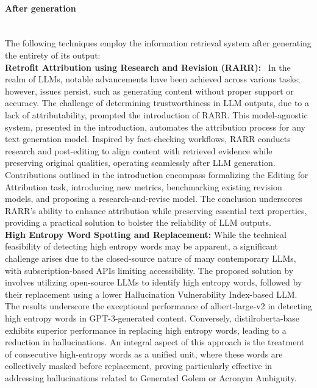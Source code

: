 \documentclass[11pt]{article}
\begin{document}
\paragraph{After generation} \mbox{} \\
\label{subsubsubsec:After generation}
The following techniques employ the information retrieval system after generating the entirety of its output: \\
\textbf{Retrofit Attribution using Research and Revision (RARR):}~\cite{gao2023rarr} In the realm of LLMs, notable advancements have been achieved across various tasks; however, issues persist, such as generating content without proper support or accuracy. The challenge of determining trustworthiness in LLM outputs, due to a lack of attributability, prompted the introduction of RARR. This model-agnostic system, presented in the introduction, automates the attribution process for any text generation model. Inspired by fact-checking workflows, RARR conducts research and post-editing to align content with retrieved evidence while preserving original qualities, operating seamlessly after LLM generation. Contributions outlined in the introduction encompass formalizing the Editing for Attribution task, introducing new metrics, benchmarking existing revision models, and proposing a research-and-revise model. The conclusion underscores RARR's ability to enhance attribution while preserving essential text properties, providing a practical solution to bolster the reliability of LLM outputs. \\
\textbf{High Entropy Word Spotting and Replacement:} While the technical feasibility of detecting high entropy words may be apparent, a significant challenge arises due to the closed-source nature of many contemporary LLMs, with subscription-based APIs limiting accessibility. The proposed solution by \cite{rawte2023troubling} involves utilizing open-source LLMs to identify high entropy words, followed by their replacement using a lower Hallucination Vulnerability Index-based LLM. The results underscore the exceptional performance of albert-large-v2 \cite{Lan2020ALBERT:} in detecting high entropy words in GPT-3-generated content. Conversely, distilroberta-base \cite{sanh2019distilbert} exhibits superior performance in replacing high entropy words, leading to a reduction in hallucinations. An integral aspect of this approach is the treatment of consecutive high-entropy words as a unified unit, where these words are collectively masked before replacement, proving particularly effective in addressing hallucinations related to Generated Golem or Acronym Ambiguity.
\end{document}
